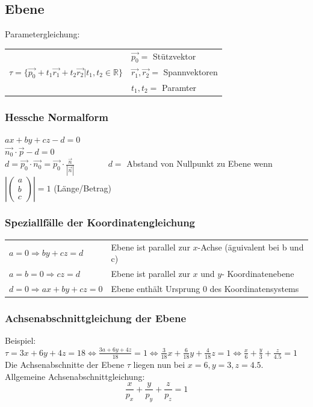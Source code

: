\subsection{Ebene}
	Parametergleichung: \begin{tabular}{ll}
		& $\vec{p_0} =$ Stützvektor\\
		$\tau = \lbrace\vec{p_0} + t_1\vec{r_1} + t_2\vec{r_2} | t_1, t_2 \in \mathbb{R}\rbrace$ & $\vec{r_1}, \vec{r_2} =$ Spannvektoren \\
		& $t_1, t_2 =$ Paramter
	\end{tabular}

	\subsubsection{Hessche Normalform}
		$ax + by + cz - d = 0$\\
		$\vec{n_0} \cdot \vec{p} - d = 0$\\
		$d = \vec{p_0} \cdot \vec{n_0} = \vec{p_0} \cdot \frac{\vec{n}}{|\vec{n}|} \qquad \qquad
		d = $ Abstand von Nullpunkt zu Ebene wenn $\left|\left(\begin{array}{c} a \\ b \\ c \end{array}\right)\right| = 1$ (Länge/Betrag)

	\subsubsection{Speziallfälle der Koordinatengleichung}
		\begin{tabular}{ll}
			$a = 0 \Rightarrow by + cz = d$ & Ebene ist parallel zur $x$-Achse (äguivalent bei b und c)\\
			$a = b = 0 \Rightarrow cz = d$ & Ebene ist parallel zur $x$ und $y$- Koordinatenebene\\
			$d = 0 \Rightarrow ax + by + cz = 0$ & Ebene enthält Ursprung 0 des Koordinatensystems
		\end{tabular}

	\subsubsection{Achsenabschnittgleichung der Ebene}
		Beispiel: $\tau = 3x + 6y + 4z = 18 \Leftrightarrow \frac{3a + 6y + 4z}{18} = 1 \Leftrightarrow \frac{3}{18}x + \frac{6}{18}y + \frac{4}{18}z = 1
		\Leftrightarrow \frac{x}{6} + \frac{y}{3} + \frac{z}{4.5} = 1$\\
		Die Achsenabschnitte der Ebene $\tau$ liegen nun bei $x = 6, y = 3, z = 4.5$.\\
		Allgemeine Achsenabschnittgleichung: $$ \frac{x}{p_x} + \frac{y}{p_y} + \frac{z}{p_z} = 1$$

